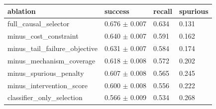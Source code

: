 \begin{tabular}{llll}
\toprule
ablation & success & recall & spurious \\
\midrule
full\_causal\_selector & 0.676 $\pm$ 0.007 & 0.634 & 0.131 \\
minus\_cost\_constraint & 0.640 $\pm$ 0.007 & 0.591 & 0.162 \\
minus\_tail\_failure\_objective & 0.631 $\pm$ 0.007 & 0.584 & 0.174 \\
minus\_mechanism\_coverage & 0.618 $\pm$ 0.008 & 0.572 & 0.202 \\
minus\_spurious\_penalty & 0.607 $\pm$ 0.008 & 0.565 & 0.245 \\
minus\_intervention\_score & 0.600 $\pm$ 0.008 & 0.556 & 0.222 \\
classifier\_only\_selection & 0.566 $\pm$ 0.009 & 0.534 & 0.268 \\
\bottomrule
\end{tabular}

